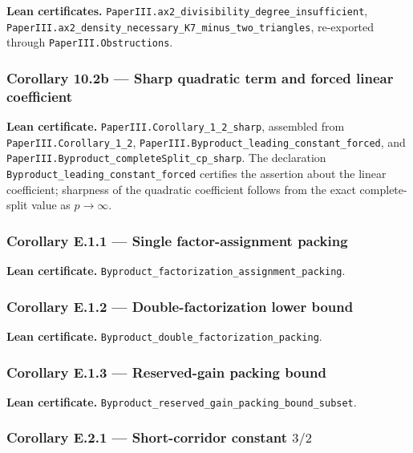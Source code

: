 \documentclass[english,11pt,a4paper]{article}
\begin{document}
\textbf{Lean certificates.}
\nolinkurl{PaperIII.ax2_divisibility_degree_insufficient},
\nolinkurl{PaperIII.ax2_density_necessary_K7_minus_two_triangles},
re-exported through \nolinkurl{PaperIII.Obstructions}.

\subsubsection{Corollary 10.2b --- Sharp quadratic term and forced
linear
coefficient}\label{corollary-10.2b-sharp-quadratic-term-and-forced-linear-coefficient}

\textbf{Lean certificate.} \nolinkurl{PaperIII.Corollary_1_2_sharp},
assembled from \nolinkurl{PaperIII.Corollary_1_2},
\nolinkurl{PaperIII.Byproduct_leading_constant_forced}, and
\nolinkurl{PaperIII.Byproduct_completeSplit_cp_sharp}. The declaration
\nolinkurl{Byproduct_leading_constant_forced} certifies the assertion
about the linear coefficient; sharpness of the quadratic coefficient
follows from the exact complete-split value as \(p\to\infty\).

\subsubsection{Corollary E.1.1 --- Single factor-assignment
packing}\label{corollary-e.1.1-single-factor-assignment-packing}

\textbf{Lean certificate.}
\nolinkurl{Byproduct_factorization_assignment_packing}.

\subsubsection{Corollary E.1.2 --- Double-factorization lower
bound}\label{corollary-e.1.2-double-factorization-lower-bound}

\textbf{Lean certificate.}
\nolinkurl{Byproduct_double_factorization_packing}.

\subsubsection{Corollary E.1.3 --- Reserved-gain packing
bound}\label{corollary-e.1.3-reserved-gain-packing-bound}

\textbf{Lean certificate.}
\nolinkurl{Byproduct_reserved_gain_packing_bound_subset}.

\subsubsection{\texorpdfstring{Corollary E.2.1 --- Short-corridor
constant
\(3/2\)}{Corollary E.2.1 --- Short-corridor constant 3/2}}\label{corollary-e.2.1-short-corridor-constant-32}
\end{document}
